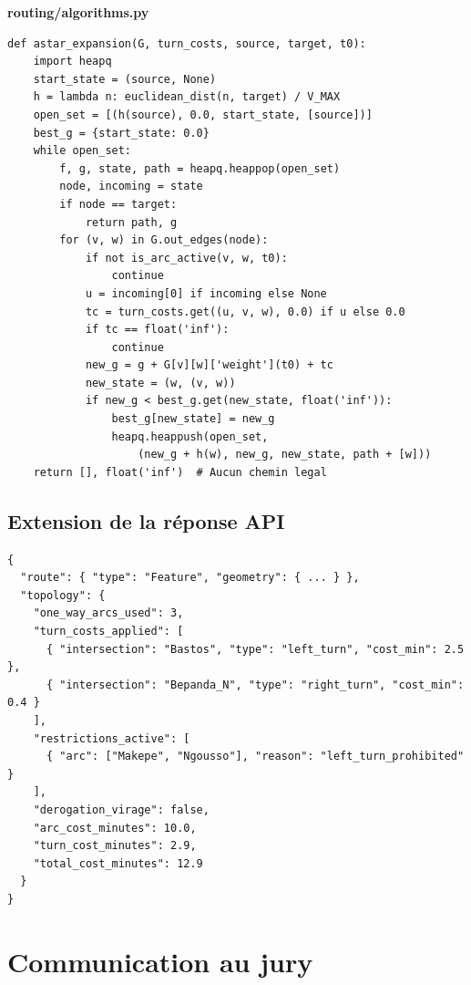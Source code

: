 \documentclass[12pt,a4paper]{article}
\theoremstyle{definition}
\theoremstyle{remark}
\begin{document}
{\small\color{theorie}\bfseries routing/algorithms.py}
\begin{verbatim}
def astar_expansion(G, turn_costs, source, target, t0):
    import heapq
    start_state = (source, None)
    h = lambda n: euclidean_dist(n, target) / V_MAX
    open_set = [(h(source), 0.0, start_state, [source])]
    best_g = {start_state: 0.0}
    while open_set:
        f, g, state, path = heapq.heappop(open_set)
        node, incoming = state
        if node == target:
            return path, g
        for (v, w) in G.out_edges(node):
            if not is_arc_active(v, w, t0):
                continue
            u = incoming[0] if incoming else None
            tc = turn_costs.get((u, v, w), 0.0) if u else 0.0
            if tc == float('inf'):
                continue
            new_g = g + G[v][w]['weight'](t0) + tc
            new_state = (w, (v, w))
            if new_g < best_g.get(new_state, float('inf')):
                best_g[new_state] = new_g
                heapq.heappush(open_set,
                    (new_g + h(w), new_g, new_state, path + [w]))
    return [], float('inf')  # Aucun chemin legal
\end{verbatim}

\subsection{Extension de la réponse API}

\begin{verbatim}
{
  "route": { "type": "Feature", "geometry": { ... } },
  "topology": {
    "one_way_arcs_used": 3,
    "turn_costs_applied": [
      { "intersection": "Bastos", "type": "left_turn", "cost_min": 2.5 },
      { "intersection": "Bepanda_N", "type": "right_turn", "cost_min": 0.4 }
    ],
    "restrictions_active": [
      { "arc": ["Makepe", "Ngousso"], "reason": "left_turn_prohibited" }
    ],
    "derogation_virage": false,
    "arc_cost_minutes": 10.0,
    "turn_cost_minutes": 2.9,
    "total_cost_minutes": 12.9
  }
}
\end{verbatim}

\newpage

\section{Communication au jury}
\end{document}
